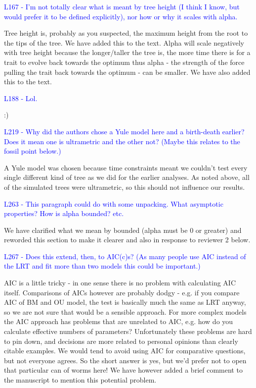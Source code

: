 \documentclass[12pt]{letter}
\begin{document}
\begin{letter}{}
\textcolor{blue}{L167 - I'm not totally clear what is meant by tree height (I think I know, but would prefer it to be defined explicitly), nor how or why it scales with alpha.}

Tree height is, probably as you suspected, the maximum height from the root to the tips of the tree. We have added this to the text. Alpha will scale negatively with tree height because the longer/taller the tree is, the more time there is for a trait to evolve back towards the optimum thus alpha - the strength of the force pulling the trait back towards the optimum - can be smaller. We have also added this to the text.

\textcolor{blue}{L188 - Lol.}

:)

\textcolor{blue}{L219 - Why did the authors chose a Yule model here and a birth-death earlier? Does it mean one is ultrametric and the other not? (Maybe this relates to the fossil point below.)}

A Yule model was chosen because time constraints meant we couldn't test every single different kind of tree as we did for the earlier analyses. As noted above, all of the simulated trees were ultrametric, so this should not influence our results. 

\textcolor{blue}{L263 - This paragraph could do with some unpacking. What asymptotic properties? How is alpha bounded? etc.}

We have clarified what we mean by bounded (alpha must be 0 or greater) and reworded this section to make it clearer and also in response to reviewer 2 below.

\textcolor{blue}{L267 - Does this extend, then, to AIC(c)s? (As many people use AIC instead of the LRT and fit more than two models this could be important.)}

AIC is a little tricky - in one sense there is no problem with calculating AIC itself. Comparisons of AICs however are probably dodgy - e.g. if you compare AIC of BM and OU model, the test is basically much the same as LRT anyway, so we are not sure that would be a sensible approach. For more complex models the AIC approach has problems that are unrelated to AIC, e.g. how do you calculate effective numbers of parameters? Unfortunately these problems are hard to pin down, and decisions are more related to personal opinions than clearly citable examples. We would tend to avoid using AIC for comparative questions, but not everyone agrees. So the short answer is yes, but we'd prefer not to open that particular can of worms here! We have however added a brief comment to the manuscript to mention this potential problem.


\end{letter}
\end{document}
